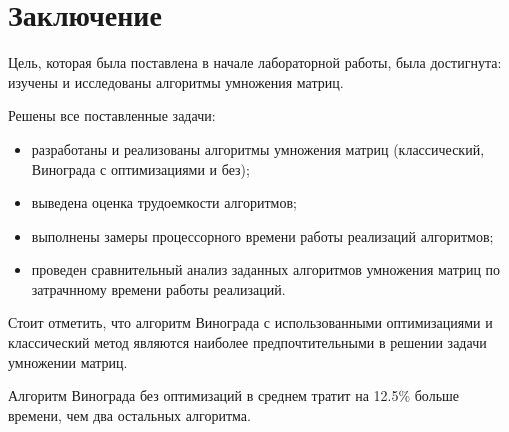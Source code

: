 \chapter*{Заключение}

Цель, которая была поставлена в начале лабораторной работы, была достигнута: изучены и исследованы алгоритмы умножения матриц.

Решены все поставленные задачи:

\begin{itemize}
	\item разработаны и реализованы алгоритмы умножения матриц (классический, Винограда с оптимизациями и без);
	\item выведена оценка трудоемкости алгоритмов;
    \item выполнены замеры процессорного времени работы реализаций алгоритмов;
	\item проведен сравнительный анализ заданных алгоритмов умножения матриц по затрачнному времени работы реализаций.
\end{itemize}

Стоит отметить, что алгоритм Винограда с использованными оптимизациями и классический метод являются наиболее предпочтительными в решении задачи умножении матриц. 

Алгоритм Винограда без оптимизаций в среднем тратит на 12.5\% больше времени, чем два остальных алгоритма.